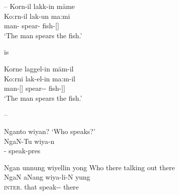 \documentclass{langscibook}
\begin{document}
\begin{xlist}
--
\ea\label{ex:key:40}
\glll Korn-il lakk-in māme \\
Ko:rn-il lak-un  ma:mi \\
man- spear- fish-[] \\
\glt  `The man spears the fish.'
\z

is

\ea\label{ex:key:41}
\glll Korne laggel-in mām-il \\
Ko:rni lak-el-in ma:m-il \\
man-[] spear-- fish-\footnotemark]] \\
\glt `The man spears the fish.'

\z




--
\ea\label{ex:key:42}
\begin{xlist}
	\ex Nganto wiyan? 
	\glt `Who speaks?' \\
	\citep[127]{Threlkeld1834}
	\ex
	\gll NgaN-Tu wiya-n \\
	-   speak-pres \\
\end{xlist}
\z

\ea\label{ex:key:43}
\begin{xlist}
	\ex Ngan                  unnung                wiyellin                       yong 
	\glt Who there talking out there \\
	\citep[127]{Threlkeld1834}
	\ex
	\gll NgaN                   aNang       wiya-li-N          yung \\
	\textsc{inter}.      that        speak--    there\footnotemark\\


\end{xlist}
\end{xlist}
\end{document}
